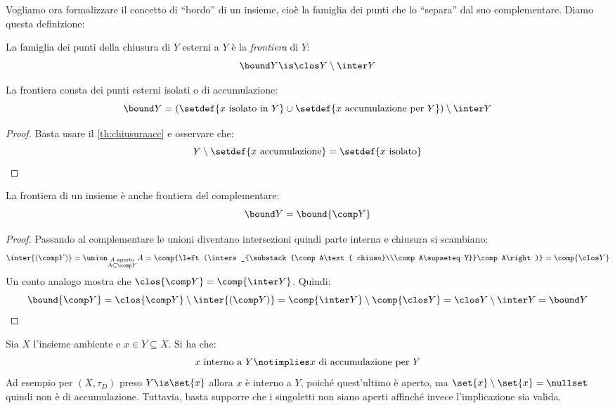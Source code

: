 Vogliamo ora formalizzare il concetto di ``bordo'' di un insieme, cioè la famiglia dei punti che lo ``separa'' dal suo complementare. Diamo questa definizione:

\begin{defn}[Frontiera]
	La famiglia dei punti della chiusura di $Y$ esterni a $Y$ è la \emph{frontiera} di $Y$:
	\[\bound Y\is\clos Y\setminus\inter Y\]
\end{defn}

\begin{prop}
	La frontiera consta dei punti esterni isolati o di accumulazione:
	\[\bound Y=(\setdef{x\text{ isolato in }Y}\cup\setdef{x\text{ accumulazione per }Y})\setminus\inter Y\]
\end{prop}

\begin{proof}
	Basta usare il \autoref{th:chiusuraacc} e osservare che:
	\[Y\setminus\setdef{x\text{ accumulazione}}=\setdef{x\text{ isolato}} \qedhere\]
\end{proof}

\begin{prop}
	La frontiera di un insieme è anche frontiera del complementare:
	\[\bound Y=\bound{\comp Y}\]
\end{prop}

\begin{proof}
	Passando al complementare le unioni diventano intersezioni quindi parte interna e chiusura si scambiano:
	\[\inter{(\comp Y)}=
	\union_{\substack{A\text{ aperto}\\A\subseteq\comp Y}}A=
	\comp{\left(\inters_{\substack{\comp A\text{ chiuso}\\\comp A\supseteq Y}}\comp A\right)}=
	\comp{\clos Y}\]
	Un conto analogo mostra che $\clos{\comp Y}=\comp{\inter Y}$.
	Quindi:
	\[\bound{\comp Y}=\clos{\comp Y}\setminus\inter{(\comp Y)}=\comp{\inter Y}\setminus\comp{\clos Y}=\clos Y\setminus\inter Y=\bound Y \qedhere\]
\end{proof}

\begin{oss}
	Sia $X$ l'insieme ambiente e $x\in Y\subseteq X$.
	Si ha che:
	\[\text{$x$ interno a $Y$} \notimplies \text{$x$ di accumulazione per $Y$}\]
	Ad esempio per $(X, \tau_D)$ preso $Y\is\set{x}$ allora $x$ è interno a $Y$, poiché quest'ultimo è aperto, ma $\set{x}\setminus\set{x} = \nullset$ quindi non è di accumulazione.
	Tuttavia, basta supporre che i singoletti non siano aperti affinché invece l'implicazione sia valida.
\end{oss}

